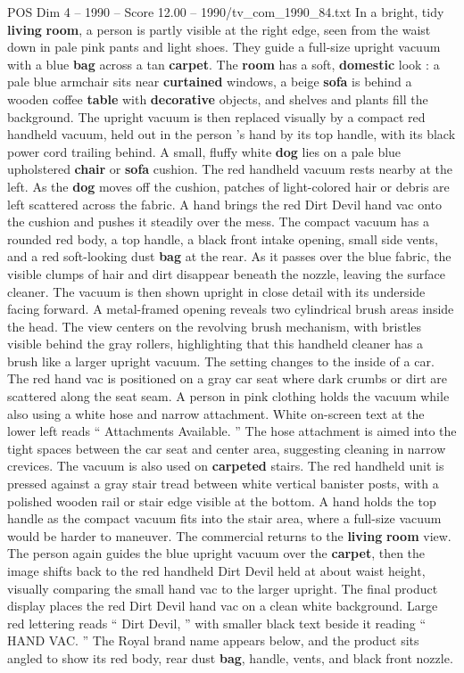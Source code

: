\begin{textsample}{POS Dim 4 – 1990 – Score 12.00 – 1990/tv\_com\_1990\_84.txt}  \label{ex:f4_pos_080}
In a bright, tidy \textbf{living} \textbf{room}, a person is partly visible at the right edge, seen from the waist down in pale pink pants and light shoes.
They guide a full-size upright vacuum with a blue \textbf{bag} across a tan \textbf{carpet}.
The \textbf{room} has a soft, \textbf{domestic} look : a pale blue armchair sits near \textbf{curtained} windows, a beige \textbf{sofa} is behind a wooden coffee \textbf{table} with \textbf{decorative} objects, and shelves and plants fill the background.
The upright vacuum is then replaced visually by a compact red handheld vacuum, held out in the person ’s hand by its top handle, with its black power cord trailing behind.
A small, fluffy white \textbf{dog} lies on a pale blue upholstered \textbf{chair} or \textbf{sofa} cushion.
The red handheld vacuum rests nearby at the left.
As the \textbf{dog} moves off the cushion, patches of light-colored hair or debris are left scattered across the fabric.
A hand brings the red Dirt Devil hand vac onto the cushion and pushes it steadily over the mess.
The compact vacuum has a rounded red body, a top handle, a black front intake opening, small side vents, and a red soft-looking dust \textbf{bag} at the rear.
As it passes over the blue fabric, the visible clumps of hair and dirt disappear beneath the nozzle, leaving the surface cleaner.
The vacuum is then shown upright in close detail with its underside facing forward.
A metal-framed opening reveals two cylindrical brush areas inside the head.
The view centers on the revolving brush mechanism, with bristles visible behind the gray rollers, highlighting that this handheld cleaner has a brush like a larger upright vacuum.
The setting changes to the inside of a car.
The red hand vac is positioned on a gray car seat where dark crumbs or dirt are scattered along the seat seam.
A person in pink clothing holds the vacuum while also using a white hose and narrow attachment.
White on-screen text at the lower left reads “ Attachments Available. ” The hose attachment is aimed into the tight spaces between the car seat and center area, suggesting cleaning in narrow crevices.
The vacuum is also used on \textbf{carpeted} stairs.
The red handheld unit is pressed against a gray stair tread between white vertical banister posts, with a polished wooden rail or stair edge visible at the bottom.
A hand holds the top handle as the compact vacuum fits into the stair area, where a full-size vacuum would be harder to maneuver.
The commercial returns to the \textbf{living} \textbf{room} view.
The person again guides the blue upright vacuum over the \textbf{carpet}, then the image shifts back to the red handheld Dirt Devil held at about waist height, visually comparing the small hand vac to the larger upright.
The final product display places the red Dirt Devil hand vac on a clean white background.
Large red lettering reads “ Dirt Devil, ” with smaller black text beside it reading “ HAND VAC. ” The Royal brand name appears below, and the product sits angled to show its red body, rear dust \textbf{bag}, handle, vents, and black front nozzle.

\end{textsample}
